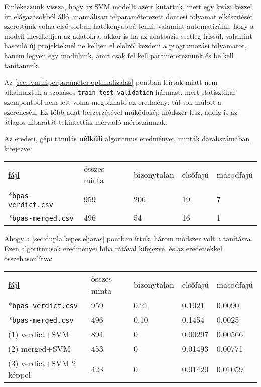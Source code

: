 Emlékezzünk vissza, hogy az SVM modellt azért kutattuk, mert egy kvázi kézzel írt elágazásokból 
álló, manuálisan felparaméterezett döntési folyamat elkészítését szerettünk volna első sorban
hatékonyabbá tenni, valamint automatizálni, hogy a modell illeszkedjen az adatokra, akkor is ha az 
adatbázis esetleg frissül, valamint hasonló új projekteknél ne kelljen el elölről kezdeni a programozási
folyamatot, hanem legyen egy modulunk, amit csak fel kell paramétereznünk és be kell tanítanunk.


Az \ref{sec:svm.hiperparameter.optimalizalas} pontban leírtak miatt nem alkalmaztuk a szokásos 
\texttt{train-test-validation} hármast, mert statisztikai szempontból nem lett volna megbízható
az eredmény: túl sok múlott a szerencsén. Ez több adat beszerzésével működőkép módszer lesz,
addig is az átlagos hibarátát tekintettük mérvadó mérőszámnak.



\noindent
Az eredeti, gépi tanulás \textbf{nélküli} algoritmus eredményei, minták \underline{darabszámában} 
kifejezve:

\begin{tabular}{ l l l l l }
	\underline{fájl} 			& összes minta 	& bizonytalan	& elsőfajú	& másodfajú \\
	*\texttt{bpas-verdict.csv} 	& 959 			& 206 			& 19	 	& 7			\\
	*\texttt{bpas-merged.csv} 	& 496			& 54 			& 16		& 1			\\
\end{tabular}

\mbox{}

\noindent
Ahogy a \ref{sec:dupla.kepes.eljaras} pontban írtuk, három módszer volt a tanításra.
Ezen algoritmusok eredményei hiba rátával kifejezve, és az eredetiekkel összehasonlítva:


\begin{tabular}{ l l l l l }
	\underline{fájl} 			& összes minta 	& bizonytalan	& elsőfajú	& másodfajú \\
	*\texttt{bpas-verdict.csv} 	& 959 			& 0.21			& 0.1021 	& 0.0090 	\\
	*\texttt{bpas-merged.csv} 	& 496			& 0.10			& 0.1454 	& 0.0025   \\
	
	\hline
	(1) verdict+SVM					& 894			& 0				& 0.00297	& 0.00566	\\
	(2) merged+SVM					& 453			& 0				& 0.01493	& 0.00771	\\
	(3) verdict+SVM 2 képpel		& 423			& 0				& 0.01420	& 0.01059   \\
	
\end{tabular}

